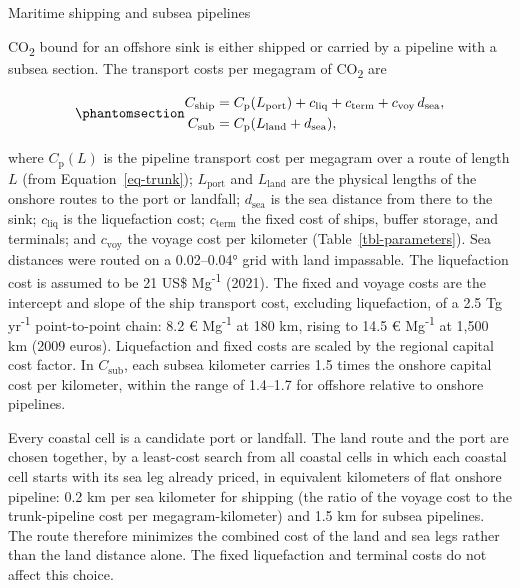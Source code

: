 \documentclass[
  letterpaper,
  twoside,
  twocolumn,
  9pt]{article}
\makeatletter
\let\oldsubparagraph\subparagraph
\renewcommand{\subparagraph}{
    \@ifstar
      \xxxSubParagraphStar
      \xxxSubParagraphNoStar
  }
\newcommand{\xxxSubParagraphStar}[1]{\oldsubparagraph*{#1}\mbox{}}
\newcommand{\xxxSubParagraphNoStar}[1]{\oldsubparagraph{#1}\mbox{}}
\makeatother
\begin{document}
\subparagraph{Maritime shipping and subsea
pipelines}\label{maritime-shipping-and-subsea-pipelines}

CO\textsubscript{2} bound for an offshore sink is either shipped or
carried by a pipeline with a subsea section. The transport costs per
megagram of CO\textsubscript{2} are

\begin{equation}\phantomsection\label{eq-offshore}{\begin{aligned}
C_{\mathrm{ship}} &= C_{\mathrm{p}}(L_{\mathrm{port}}) + c_{\mathrm{liq}} + c_{\mathrm{term}} + c_{\mathrm{voy}}\, d_{\mathrm{sea}}, \\
C_{\mathrm{sub}} &= C_{\mathrm{p}}(L_{\mathrm{land}} + d_{\mathrm{sea}}),
\end{aligned}}\end{equation}

where \(C_{\mathrm{p}}(L)\) is the pipeline transport cost per megagram
over a route of length \(L\) (from Equation~\ref{eq-trunk});
\(L_{\mathrm{port}}\) and \(L_{\mathrm{land}}\) are the physical lengths
of the onshore routes to the port or landfall; \(d_{\mathrm{sea}}\) is
the sea distance from there to the sink; \(c_{\mathrm{liq}}\) is the
liquefaction cost; \(c_{\mathrm{term}}\) the fixed cost of ships, buffer
storage, and terminals; and \(c_{\mathrm{voy}}\) the voyage cost per
kilometer (Table~\ref{tbl-parameters}). Sea distances were routed on a
0.02--0.04° grid with land impassable. The liquefaction cost is assumed
to be 21 US\$ Mg\textsuperscript{-1} (2021).\citep{chen2021liquefaction}
The fixed and voyage costs are the intercept and slope of the ship
transport cost, excluding liquefaction, of a 2.5 Tg
yr\textsuperscript{-1} point-to-point chain: 8.2 €
Mg\textsuperscript{-1} at 180 km, rising to 14.5 €
Mg\textsuperscript{-1} at 1,500 km (2009 euros).\citep{zep2011transport}
Liquefaction and fixed costs are scaled by the regional capital cost
factor. In \(C_{\mathrm{sub}}\), each subsea kilometer carries 1.5 times
the onshore capital cost per kilometer, within the range of 1.4--1.7 for
offshore relative to onshore pipelines.\citep{vito2026emis}

Every coastal cell is a candidate port or landfall. The land route and
the port are chosen together, by a least-cost search from all coastal
cells in which each coastal cell starts with its sea leg already priced,
in equivalent kilometers of flat onshore pipeline: 0.2 km per sea
kilometer for shipping (the ratio of the voyage cost to the
trunk-pipeline cost per megagram-kilometer) and 1.5 km for subsea
pipelines. The route therefore minimizes the combined cost of the land
and sea legs rather than the land distance alone. The fixed liquefaction
and terminal costs do not affect this choice.
\end{document}
